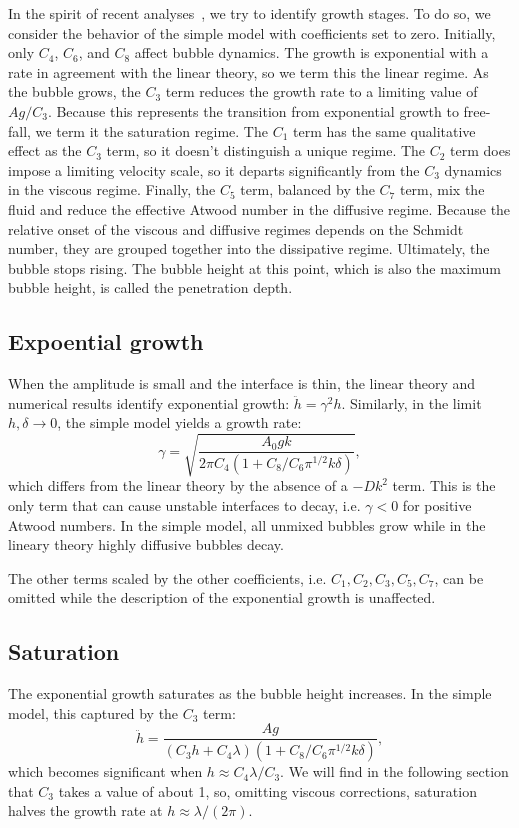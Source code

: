 In the spirit of recent analyses~\cite{Ramaprabhu2012, Wei2012}, we try to identify growth stages.
To do so, we consider the behavior of the simple model with coefficients set to zero.
Initially, only $C_4$, $C_6$, and $C_8$ affect bubble dynamics.
The growth is exponential with a rate in agreement with the linear theory, so we term this the linear regime.
As the bubble grows, the $C_3$ term reduces the growth rate to a limiting value of $A g / C_3$.
Because this represents the transition from exponential growth to free-fall, we term it the saturation regime.
The $C_1$ term has the same qualitative effect as the $C_3$ term, so it doesn't distinguish a unique regime.
The $C_2$ term does impose a limiting velocity scale, so it departs significantly from the $C_3$ dynamics in the viscous regime.
Finally, the $C_5$ term, balanced by the $C_7$ term, mix the fluid and reduce the effective Atwood number in the diffusive regime.
Because the relative onset of the viscous and diffusive regimes depends on the Schmidt number, they are grouped together into the dissipative regime.
Ultimately, the bubble stops rising.
The bubble height at this point, which is also the maximum bubble height, is called the penetration depth.

\subsection{Expoential growth}
When the amplitude is small and the interface is thin, the linear theory and numerical results identify exponential growth: $\ddot{h} = \gamma^2 h$.
Similarly, in the limit $h, \delta \rightarrow 0$, the simple model yields a growth rate:
\begin{equation}
\gamma = \sqrt{\frac{A_0 g k}{2 \pi C_4(1 + C_8 / C_6 \pi^{1/2} k \delta)}},
\end{equation}
which differs from the linear theory by the absence of a $-D k^2$ term.
This is the only term that can cause unstable interfaces to decay, i.e. $\gamma < 0$ for positive Atwood numbers.
In the simple model, all unmixed bubbles grow while in the lineary theory highly diffusive bubbles decay.

The other terms scaled by the other coefficients, i.e. $C_1, C_2, C_3, C_5, C_7$, can be omitted while the description of the exponential growth is unaffected.

\subsection{Saturation}
The exponential growth saturates as the bubble height increases.
In the simple model, this captured by the $C_3$ term:
\begin{equation}
\ddot{h} = \frac{A g}{(C_3 h + C_4 \lambda) (1 + C_8 / C_6 \pi^{1/2} k \delta)},
\end{equation}
which becomes significant when $h \approx C_4 \lambda / C_3$.
We will find in the following section that $C_3$ takes a value of about 1, so, omitting viscous corrections, saturation halves the growth rate at $h \approx \lambda / (2\pi)$.

